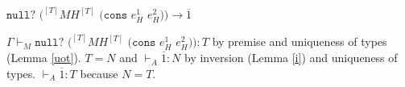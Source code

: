\begin{case}
$\mathtt{null?}$ $(^{[T]}MH^{[T]}$ $(\mathtt{cons}$ $e_{H}^{1}$ $e_{H}^{2}))\rightarrow\overline{1}$

$\Gamma\vdash_{M}\mathtt{null?}$ $(^{[T]}MH^{[T]}$ $(\mathtt{cons}$ $e_{H}^{1}$ $e_{H}^{2})):T$ by premise and uniqueness of types (Lemma \ref{uot}).  $T=N$ and $\vdash_{A}\overline{1}:N$ by inversion (Lemma \ref{i}) and uniqueness of types.  $\vdash_{A}\overline{1}:T$ because $N=T$.
\end{case}